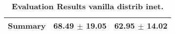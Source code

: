 \begin{table}[htb]
{\begin{tabular}{lll}
\midrule
\textbf{Summary                                  } &                  \phantom{0}68.49 $\pm$ 19.05 &                      \phantom{0}62.95 $\pm$ 14.02 \\
\bottomrule
\end{tabular}%
}
\caption{\textbf{Evaluation Results vanilla distrib inet.}}
\label{tab:eval-results}
\end{table}

